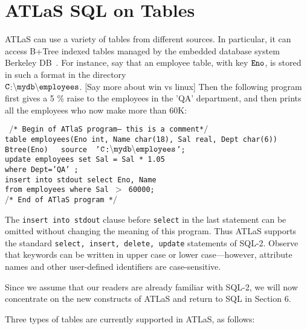 \chapter{ATLaS SQL on Tables}
ATLaS can use a variety of tables from different sources. In
particular, it can access B+Tree indexed tables managed by the embedded
database system Berkeley DB~\cite{berkeleydb}. For instance, say that an
employee table, with key $\tt Eno$, is stored in such a format in
the directory\\
$\tt C$:$\tt \backslash mydb \backslash employees$.
[Say more about win vs linux] Then the following
program  first gives a 5 \% raise to the employees in the 'QA'
department, and then prints all the employees who now make more
than 60K:


\begin{codedisplay}
\tt
\>\>\>\>\>\>\>\>\> $\slash$* Begin of ATlaS program--- this is a comment*$\slash$\\
\>\>table employees(Eno int, Name char(18), Sal real, Dept char(6)) \\
 \> \>    \> \> \> \> Btree(Eno) ~  source \
 '$\tt C$:$\tt \backslash  mydb\backslash employees$';\\[0.1cm]
 \> \> update employees set Sal = Sal * 1.05\\
       \> \> \> \> \> where Dept='QA' ;\\[0.1cm]
 \> \> insert into stdout select Eno, Name\\
 \> \> \> \> \> from employees where Sal $>$ 60000;\\
\>\>\>\>\>\>\>\>\> $\slash$* End of ATlaS program *$\slash$\\
\end{codedisplay}

The {\tt insert into stdout} clause before {\tt select} in the last
statement can be omitted without changing the meaning of this program.
Thus ATLaS supports the standard {\tt select, insert, delete, update}
statements of SQL-2. Observe that keywords can be written in upper
case or lower case---however, attribute names and other user-defined
identifiers are case-sensitive.

Since we assume that our readers are already familiar
with SQL-2, we will now concentrate on the new constructs of ATLaS and
return to SQL in Section 6.

Three types of tables are currently supported in ATLaS, as follows:

